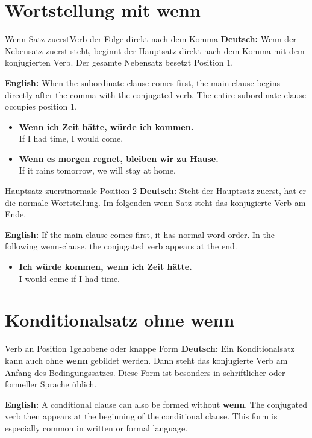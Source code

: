 \documentclass[a4paper,11pt]{article}
\newcommand{\GermanText}[1]{\textbf{Deutsch: }#1\par}
\newcommand{\EnglishText}[1]{{\small\color{SoftGray}\textbf{English: }#1\par}}
\newcommand{\ExampleItem}[2]{\item \textbf{#1}\\{\small\color{SoftGray}#2}}
\begin{document}
    \section{Wortstellung mit wenn}

        \begin{grammarentry}{Wenn-Satz zuerst}{Verb der Folge direkt nach dem Komma}
            \GermanText{Wenn der Nebensatz zuerst steht, beginnt der Hauptsatz direkt nach dem Komma mit dem konjugierten Verb. Der gesamte Nebensatz besetzt Position 1.}
            \EnglishText{When the subordinate clause comes first, the main clause begins directly after the comma with the conjugated verb. The entire subordinate clause occupies position 1.}
        \end{grammarentry}

        \begin{exbox}
            \begin{itemize}
                \ExampleItem{Wenn ich Zeit hätte, würde ich kommen.}{If I had time, I would come.}
                \ExampleItem{Wenn es morgen regnet, bleiben wir zu Hause.}{If it rains tomorrow, we will stay at home.}
            \end{itemize}
        \end{exbox}

        \begin{grammarentry}{Hauptsatz zuerst}{normale Position 2}
            \GermanText{Steht der Hauptsatz zuerst, hat er die normale Wortstellung. Im folgenden wenn-Satz steht das konjugierte Verb am Ende.}
            \EnglishText{If the main clause comes first, it has normal word order. In the following wenn-clause, the conjugated verb appears at the end.}
        \end{grammarentry}

        \begin{exbox}
            \begin{itemize}
                \ExampleItem{Ich würde kommen, wenn ich Zeit hätte.}{I would come if I had time.}
            \end{itemize}
        \end{exbox}

    \section{Konditionalsatz ohne wenn}

        \begin{grammarentry}{Verb an Position 1}{gehobene oder knappe Form}
            \GermanText{Ein Konditionalsatz kann auch ohne \textbf{wenn} gebildet werden. Dann steht das konjugierte Verb am Anfang des Bedingungssatzes. Diese Form ist besonders in schriftlicher oder formeller Sprache üblich.}
            \EnglishText{A conditional clause can also be formed without \textbf{wenn}. The conjugated verb then appears at the beginning of the conditional clause. This form is especially common in written or formal language.}
        \end{grammarentry}
\end{document}
